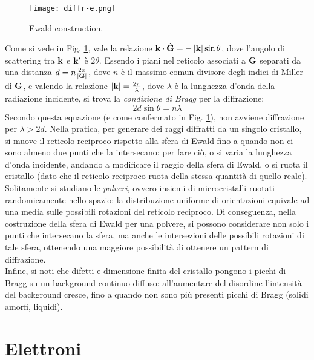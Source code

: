 \begin{figure}
	\centering
	\texttt{[image: diffr-e.png]}
	\caption{Ewald construction.}
	\label{diffr-e}
\end{figure}

Come si vede in Fig. \ref{diffr-e}, vale la relazione $ \mathbf{k} \cdot \hat{\mathbf{G}} = - \left\lvert\mathbf{k}\right\rvert \sin \theta $, dove l'angolo di scattering tra $ \mathbf{k} $ e $ \mathbf{k}' $ è $ 2\theta $. Essendo i piani nel reticolo associati a $ \mathbf{G} $ separati da una distanza $ d = n \frac{2\pi}{\left\lvert\mathbf{G}\right\rvert} $, dove $ n $ è il massimo comun divisore degli indici di Miller di $ \mathbf{G} $, e valendo la relazione $ \left\lvert\mathbf{k}\right\rvert = \frac{2\pi}{\lambda} $, dove $ \lambda $ è la lunghezza d'onda della radiazione incidente, si trova la \textit{condizione di Bragg} per la diffrazione:
\begin{equation}
	2 d \sin \theta = n \lambda
\end{equation}
Secondo questa equazione (e come confermato in Fig. \ref{diffr-e}), non avviene diffrazione per $ \lambda > 2d $. Nella pratica, per generare dei raggi diffratti da un singolo cristallo, si muove il reticolo reciproco rispetto alla sfera di Ewald fino a quando non ci sono almeno due punti che la intersecano: per fare ciò, o si varia la lunghezza d'onda incidente, andando a modificare il raggio della sfera di Ewald, o si ruota il cristallo (dato che il reticolo reciproco ruota della stessa quantità di quello reale). \\
Solitamente si studiano le \textit{polveri}, ovvero insiemi di microcristalli ruotati randomicamente nello spazio: la distribuzione uniforme di orientazioni equivale ad una media sulle possibili rotazioni del reticolo reciproco. Di conseguenza, nella costruzione della sfera di Ewald per una polvere, si possono considerare non solo i punti che intersecano la sfera, ma anche le intersezioni delle possibili rotazioni di tale sfera, ottenendo una maggiore possibilità di ottenere un pattern di diffrazione. \\
Infine, si noti che difetti e dimensione finita del cristallo pongono i picchi di Bragg su un background continuo diffuso: all'aumentare del disordine l'intensità del background cresce, fino a quando non sono più presenti picchi di Bragg (solidi amorfi, liquidi).

\section{Elettroni}

